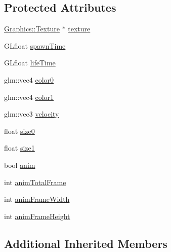 \subsection*{Protected Attributes}
\begin{DoxyCompactItemize}
\item 
\mbox{\hyperlink{class_beer_engine_1_1_graphics_1_1_texture}{Graphics\+::\+Texture}} $\ast$ \mbox{\hyperlink{class_beer_engine_1_1_component_1_1_particle_base_a7afe80018ab65ec12da1cbbfdef232ef}{texture}}
\item 
G\+Lfloat \mbox{\hyperlink{class_beer_engine_1_1_component_1_1_particle_base_a6c29514552d72aaf6824763c76ed029f}{spawn\+Time}}
\item 
G\+Lfloat \mbox{\hyperlink{class_beer_engine_1_1_component_1_1_particle_base_a1c8c09bee68215e61f68221897d88cac}{life\+Time}}
\item 
glm\+::vec4 \mbox{\hyperlink{class_beer_engine_1_1_component_1_1_particle_base_a29bad376ecc461fa1c2d2e7bceb90944}{color0}}
\item 
glm\+::vec4 \mbox{\hyperlink{class_beer_engine_1_1_component_1_1_particle_base_a630127aeffcf23b329758598ff487784}{color1}}
\item 
glm\+::vec3 \mbox{\hyperlink{class_beer_engine_1_1_component_1_1_particle_base_aeed116a784d9e6fd5ad9c3ad45a7969e}{velocity}}
\item 
float \mbox{\hyperlink{class_beer_engine_1_1_component_1_1_particle_base_ac835f4005c806924bd35f19bff26fd27}{size0}}
\item 
float \mbox{\hyperlink{class_beer_engine_1_1_component_1_1_particle_base_a34fcb453b19a4ae83e9ba26bd6084d27}{size1}}
\item 
bool \mbox{\hyperlink{class_beer_engine_1_1_component_1_1_particle_base_a2a0bf46b0663456a0ceeec6681d924ba}{anim}}
\item 
int \mbox{\hyperlink{class_beer_engine_1_1_component_1_1_particle_base_a7ad60f015b206ea86203cb006aedc956}{anim\+Total\+Frame}}
\item 
int \mbox{\hyperlink{class_beer_engine_1_1_component_1_1_particle_base_ac776b0ee55b461cafe2e7dea4295dc9d}{anim\+Frame\+Width}}
\item 
int \mbox{\hyperlink{class_beer_engine_1_1_component_1_1_particle_base_ae64df095ec97418da7c807d6d0207565}{anim\+Frame\+Height}}
\end{DoxyCompactItemize}
\subsection*{Additional Inherited Members}


